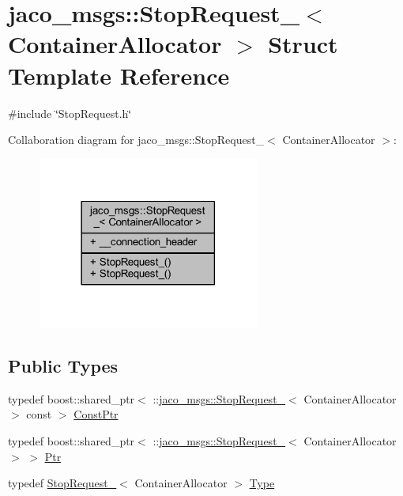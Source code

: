 \hypertarget{structjaco__msgs_1_1StopRequest__}{}\section{jaco\+\_\+msgs\+:\+:Stop\+Request\+\_\+$<$ Container\+Allocator $>$ Struct Template Reference}
\label{structjaco__msgs_1_1StopRequest__}


{\ttfamily \#include \char`\"{}Stop\+Request.\+h\char`\"{}}



Collaboration diagram for jaco\+\_\+msgs\+:\+:Stop\+Request\+\_\+$<$ Container\+Allocator $>$\+:
\nopagebreak
\begin{figure}[H]
\begin{center}
\leavevmode
\includegraphics[width=206pt]{dd/d9f/structjaco__msgs_1_1StopRequest____coll__graph}
\end{center}
\end{figure}
\subsection*{Public Types}
\begin{DoxyCompactItemize}
\item 
typedef boost\+::shared\+\_\+ptr$<$ \+::\hyperlink{structjaco__msgs_1_1StopRequest__}{jaco\+\_\+msgs\+::\+Stop\+Request\+\_\+}$<$ Container\+Allocator $>$ const  $>$ \hyperlink{structjaco__msgs_1_1StopRequest___a8b4d8e02d8ae83d158cea49a234a07ff}{Const\+Ptr}
\item 
typedef boost\+::shared\+\_\+ptr$<$ \+::\hyperlink{structjaco__msgs_1_1StopRequest__}{jaco\+\_\+msgs\+::\+Stop\+Request\+\_\+}$<$ Container\+Allocator $>$ $>$ \hyperlink{structjaco__msgs_1_1StopRequest___ae726f4f132f3ee8365f7dfaa7e92dd3a}{Ptr}
\item 
typedef \hyperlink{structjaco__msgs_1_1StopRequest__}{Stop\+Request\+\_\+}$<$ Container\+Allocator $>$ \hyperlink{structjaco__msgs_1_1StopRequest___a407910ce1da798042beb37f367c3a3df}{Type}
\end{DoxyCompactItemize}
